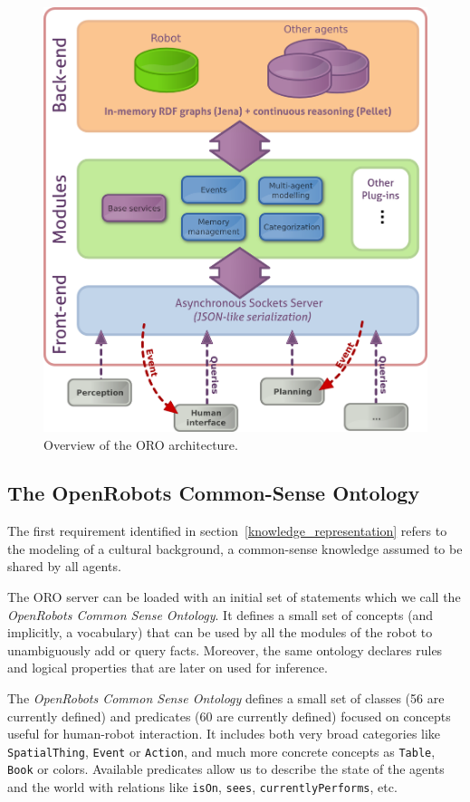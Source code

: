 \documentclass[twocolumn]{svjour3}
\newcommand{\concept}[1]{{\footnotesize \texttt{#1}}}
\begin{document}
\begin{figure}[!ht]
\centering
  \includegraphics[width=0.8\linewidth]{images/oro_architecture.png}
  \caption{Overview of the ORO architecture.}
  \label{fig|oro-overview}
\end{figure}

\subsection{The OpenRobots Common-Sense Ontology}
\label{ontology}

The first requirement identified in section~\ref{knowledge_representation}
refers to the modeling of a cultural background, a common-sense knowledge
assumed to be shared by all agents.

The ORO server can be loaded with an initial set of statements which we call
the \emph{OpenRobots Common Sense Ontology}. It defines a small set of concepts
(and implicitly, a vocabulary) that can be used by all the modules of the robot
to unambiguously add or query facts. Moreover, the same ontology declares rules
and logical properties that are later on used for inference.

The \emph{OpenRobots Common Sense Ontology} defines a small set of classes (56
are currently defined) and predicates (60 are currently defined) focused on
concepts useful for human-robot interaction. It includes both very broad
categories like \concept{SpatialThing}, \concept{Event} or \concept{Action},
and much more concrete concepts as \concept{Table}, \concept{Book} or colors.
Available predicates allow us to describe the state of the agents and the world
with relations like \concept{isOn}, \concept{sees},
\concept{currentlyPerforms}, etc.
\end{document}
